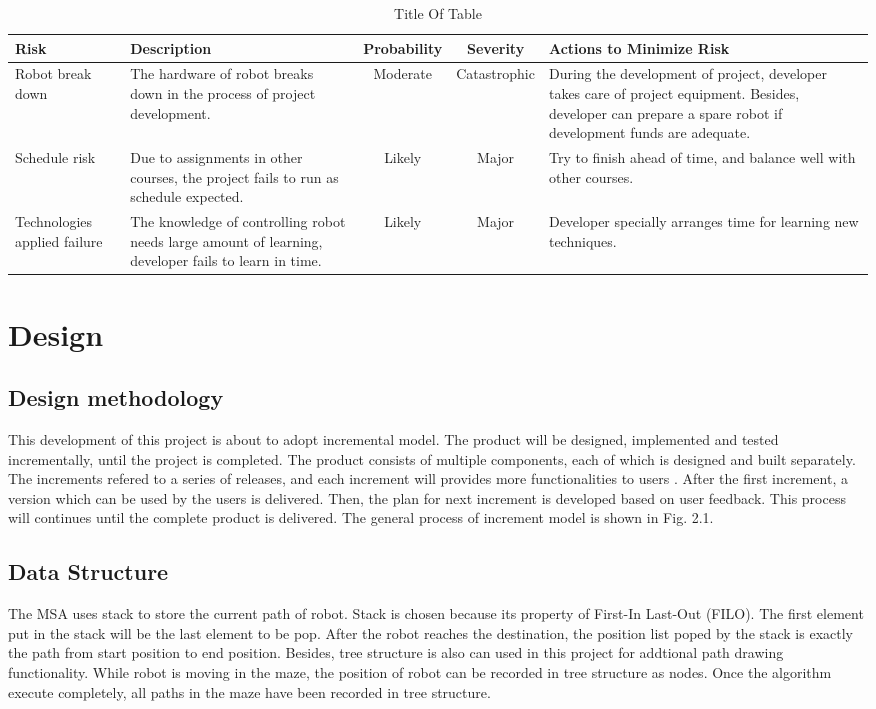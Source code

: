 \documentclass[11pt,times,oneside,openright,hardcopy]{eeereport}
\begin{document}
\begin{table}[h]
\label{tab:tab1}
\centering
\caption{ Title Of Table }
\renewcommand{\arraystretch}{2}
\setlength{\tabcolsep}{10pt}
\begin{tabular}{ | m{2cm} | m{3cm} | c | c | m{3cm} |} 
\hline Risk & Description & Probability & Severity & Actions to Minimize Risk \\ 
\hline Robot break down & The hardware of robot breaks down in the process of project development. & Moderate & Catastrophic & During the development of project, developer takes care of project equipment. Besides, developer can prepare a spare robot if development funds are adequate. \\ 
\hline Schedule risk & Due to assignments in other courses, the project fails to run as schedule expected. & Likely & Major & Try to finish ahead of time, and balance well with other courses. \\ 
\hline Technologies applied failure & The knowledge of controlling robot needs large amount of learning, developer fails to learn in time. & Likely & Major & Developer specially arranges time for learning new techniques. \\ 
\hline 
\end{tabular} 
\end{table}

\chapter{Design}\label{cpt:des}
\section{Design methodology}
This development of this project is about to adopt incremental model. The product will be designed, implemented and tested incrementally, until the project is completed. The product consists of multiple components, each of which is designed and built separately.
The increments refered to a series of releases, and each increment will provides more functionalities to users \cite{Bell:2016vq}. After the first increment, a version which can be used by the users is delivered. Then, the plan for next increment is developed based on user feedback.
This process will continues until the complete product is delivered. The general process of increment model is shown in Fig. 2.1.

\section{Data Structure}
The MSA uses stack to store the current path of robot. Stack is chosen because its property of First-In Last-Out (FILO). The first element put in the stack will be the last element to be pop. After the robot reaches the destination, the position list poped by the stack is exactly the path from start position to end position. 
Besides, tree structure is also can used in this project for addtional path drawing functionality. While robot is moving in the maze, the position of robot can be recorded in tree structure as nodes. Once the algorithm execute completely, all paths in the maze have been recorded in tree structure.
\end{document}
